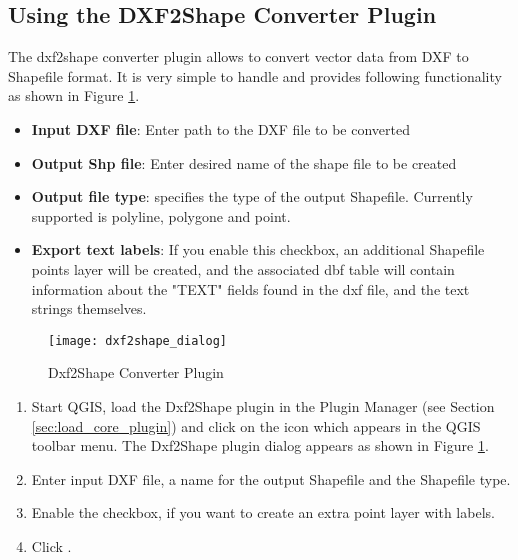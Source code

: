 \subsection{Using the DXF2Shape Converter Plugin}


The dxf2shape converter plugin allows to convert vector data from DXF to Shapefile 
format. It is very simple to handle and provides following functionality as 
shown in Figure \ref{fig:dxf2shape_dialog}.

\begin{itemize}
\item \textbf{Input DXF file}: Enter path to the DXF file to be converted
\item \textbf{Output Shp file}: Enter desired name of the shape file to be created
\item \textbf{Output file type}: specifies the type of the output Shapefile. Currently supported is polyline, polygone and point.
\item \textbf{Export text labels}: If you enable this checkbox, an additional Shapefile points layer will be created, and the associated dbf table will contain information about the "TEXT" fields found in the dxf file, and the text strings themselves.
\end{itemize}

\begin{figure}[ht]
   \begin{center}
   \caption{Dxf2Shape Converter Plugin \nixcaption}\label{fig:dxf2shape_dialog}\smallskip
   \texttt{[image: dxf2shape\_dialog]}
\end{center}  
\end{figure}

\begin{enumerate}
  \item Start QGIS, load the Dxf2Shape plugin in the Plugin Manager (see Section 
  \ref{sec:load_core_plugin}) and click on the  
  icon which appears in the QGIS toolbar menu. The Dxf2Shape plugin dialog appears as shown in Figure \ref{fig:dxf2shape_dialog}.
  \item Enter input DXF file, a name for the output Shapefile and the Shapefile type.
  \item Enable the  checkbox, if you want to create an extra point layer with labels.
  \item Click . 
\end{enumerate}

\newpage



